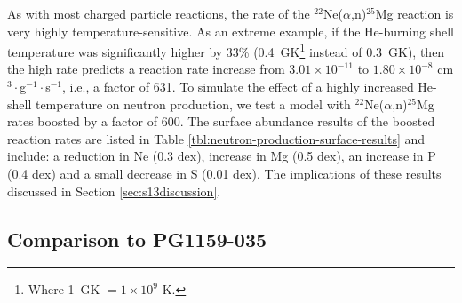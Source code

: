 As with most charged particle reactions, the rate of the $^{22}$Ne($\alpha$,n)$^{25}$Mg reaction is very highly temperature-sensitive. As an extreme example, if the He-burning shell temperature was significantly higher by 33\% (0.4~GK\footnote{Where 1~GK  $=1\times 10^{9}$ K.} instead of 0.3~GK), then the \citet{Iliadis:2010eu} high rate predicts a reaction rate increase from $3.01 \times 10^{-11}$ to $1.80 \times 10^{-8}$ cm$^3\cdot$g$^{-1}\cdot$s$^{-1}$, i.e., a factor of 631. To simulate the effect of a highly increased He-shell temperature on neutron production, we test a model with $^{22}$Ne($\alpha$,n)$^{25}$Mg rates boosted by a factor of 600. The surface abundance results of the boosted reaction rates are listed in Table \ref{tbl:neutron-production-surface-results} and include: a reduction in Ne (0.3 dex), increase in Mg (0.5 dex), an increase in P (0.4 dex) and a small decrease in S (0.01 dex). The implications of these results discussed in Section \ref{sec:s13discussion}.

\subsection{Comparison to PG1159-035}

